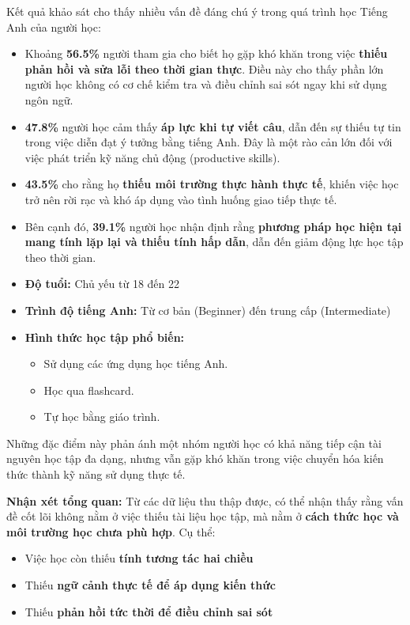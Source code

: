 Kết quả khảo sát cho thấy nhiều vấn đề đáng chú ý trong quá trình học Tiếng Anh của người học: \newline
\begin{itemize}[leftmargin = *, nosep]
\item Khoảng \textbf{56.5\%} người tham gia cho biết họ gặp khó khăn trong việc \textbf{thiếu phản hồi và sửa lỗi theo thời gian thực}. Điều này cho thấy phần lớn người học không có cơ chế kiểm tra và điều chỉnh sai sót ngay khi sử dụng ngôn ngữ. 

\item \textbf{47.8\%} người học cảm thấy \textbf{áp lực khi tự viết câu}, dẫn đến sự thiếu tự tin trong việc diễn đạt ý tưởng bằng tiếng Anh. Đây là một rào cản lớn đối với việc phát triển kỹ năng chủ động (productive skills). 

\item \textbf{43.5\%} cho rằng họ \textbf{thiếu môi trường thực hành thực tế}, khiến việc học trở nên rời rạc và khó áp dụng vào tình huống giao tiếp thực tế. 

\item Bên cạnh đó, \textbf{39.1\%} người học nhận định rằng \textbf{phương pháp học hiện tại mang tính lặp lại và thiếu tính hấp dẫn}, dẫn đến giảm động lực học tập theo thời gian.

\end{itemize}

\begin{itemize}[leftmargin = *, nosep]
    \item \textbf{Độ tuổi:} Chủ yếu từ 18 đến 22
    \item \textbf{Trình độ tiếng Anh:} Từ cơ bản (Beginner) đến trung cấp (Intermediate)
    \item \textbf{Hình thức học tập phổ biến:}
    \begin{itemize}
        \item Sử dụng các ứng dụng học tiếng Anh.
        \item Học qua flashcard.
        \item Tự học bằng giáo trình.
    \end{itemize}
\end{itemize}
Những đặc điểm này phản ánh một nhóm người học có khả năng tiếp cận tài nguyên học tập đa dạng, nhưng vẫn gặp khó khăn trong việc chuyển hóa kiến thức thành kỹ năng sử dụng thực tế. \newline

\textbf{Nhận xét tổng quan:}
Từ các dữ liệu thu thập được, có thể nhận thấy rằng vấn đề cốt lõi không nằm ở việc thiếu tài liệu học tập, mà nằm ở \textbf{cách thức học và môi trường học chưa phù hợp}. \newline
Cụ thể:
\begin{itemize}[leftmargin = *, nosep]
\item Việc học còn thiếu \textbf{tính tương tác hai chiều}
\item Thiếu \textbf{ngữ cảnh thực tế để áp dụng kiến thức}
\item Thiếu \textbf{phản hồi tức thời để điều chỉnh sai sót}
\end{itemize}

